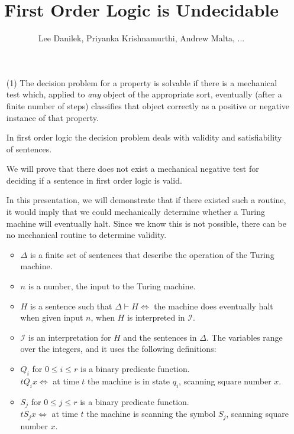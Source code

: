 \documentclass{article}
\theoremstyle{definition}
\theoremstyle{definition}
\begin{document}
\title{First Order Logic is Undecidable}
\author{Lee Danilek, Priyanka Krishnamurthi, Andrew Malta, ...}
\maketitle

\begin{enumerate}
\item[(1)] 
The decision problem for a property is solvable if there is a mechanical test which, applied to \textit{any} object of the appropriate sort, eventually (after a finite number of steps) classifies that object correctly as a positive or negative instance of that property.

In first order logic the decision problem deals with validity and satisfiability of sentences.

We will prove that there does not exist a mechanical negative test for deciding if a sentence in first order logic is valid.

In this presentation, we will demonstrate that if there existed such a routine, it would imply that we could mechanically determine whether a Turing machine will eventually halt. Since we know this is not possible, there can be no mechanical routine to determine validity.

\begin{itemize}

\item $\Delta$ is a finite set of sentences that describe the operation of the Turing machine.

\item $n$ is a number, the input to the Turing machine.

\item $H$ is a sentence such that $\Delta\vdash H\iff$ the machine does eventually halt when given input $n$, when $H$ is interpreted in $\mathscr{I}$.

\item $\mathscr{I}$ is an interpretation for $H$ and the sentences in $\Delta$. The variables range over the integers, and it uses the following definitions:

\item $Q_i$ for $0 \le i \le r$ is a binary predicate function.\\
$t Q_i x \iff $ at time $t$ the machine is in state $q_i$, scanning square number $x$.

\item $S_j$ for $0\le j\le r$ is a binary predicate function.\\
$t S_j x \iff $ at time $t$ the machine is scanning the symbol $S_j$, scanning square number $x$.


\end{itemize}
\end{enumerate}
\end{document}
